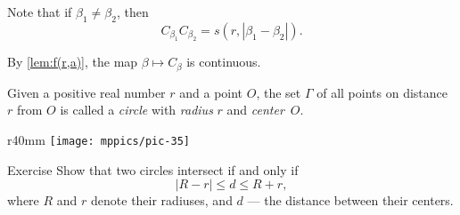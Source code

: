 Note that if $\beta_1\ne\beta_2$, then
$$C_{\beta_1}C_{\beta_2}=s(r,|\beta_1-\beta_2|).$$

By \ref{lem:f(r,a)}, the map $\beta\mapsto C_\beta$ is continuous.
\qeds



Given a positive real number $r$ and a point $O$,
the set $\Gamma$ of all points on distance $r$ from $O$ is called a \emph{circle} 
with \emph{radius} $r$ and \emph{center}~$O$.

\begin{wrapfigure}{r}{40mm}
\centering
\texttt{[image: mppics/pic-35]}
\end{wrapfigure}

\begin{thm}{Exercise}\label{ex:intersecting-circles-3}
Show that two circles intersect if and only if 
\[|R-r|\le d\le R+r,\]
where $R$ and $r$ denote their radiuses, and $d$ ---  the distance between their centers.
\end{thm}
